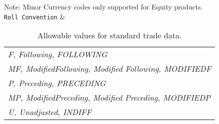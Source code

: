 \begin{table}[H]
\begin{tabu}
    Note: Minor Currency codes only supported for Equity products.  \\ \hline
    \lstinline!Roll Convention! & \begin{tabular}[l]{@{}l@{}} 
\emph{F,  Following, FOLLOWING}\\ 
\emph{MF, ModifiedFollowing, Modified Following, MODIFIEDF}\\ 
\emph{P, Preceding, PRECEDING}\\ 
\emph{MP, ModifiedPreceding, Modified Preceding, MODIFIEDP}\\ 
\emph{U, Unadjusted, INDIFF }\end{tabular}  \\ \hline
  \end{tabu}
  \caption{Allowable values for standard trade data.}
  \label{tab:allow_stand_data}
\end{table}

\newpage

